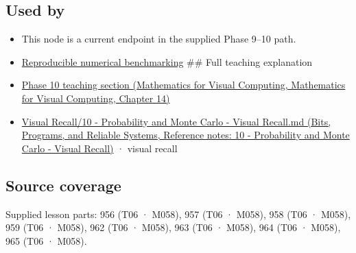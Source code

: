 \subsection{Used by}\label{appendix-bcc44e9d3d02-used-by}

\begin{itemize}
\item
  This node is a current endpoint in the supplied Phase 9--10 path.
\item
  \hyperref[appendix-b9db93e28371]{Reproducible numerical benchmarking} \#\# Full teaching explanation
\item
  \href{../02-Mathematics-for-Visual-Computing/main.pdf\#nameddest=02-foundations-ii-ch030-inference-and-error-metrics-need-explicit-assumptions}{Phase 10 teaching section (Mathematics for Visual Computing, Mathematics for Visual Computing, Chapter 14)}
\item
  \href{../01-Bits-Programs-and-Reliable-Systems/main.pdf\#nameddest=appendix-cb5af353ef77}{Visual Recall/10 - Probability and Monte Carlo - Visual Recall.md (Bits, Programs, and Reliable Systems, Reference notes: 10 - Probability and Monte Carlo - Visual Recall)} · visual recall
\end{itemize}

\subsection{Source coverage}\label{appendix-bcc44e9d3d02-source-coverage}

Supplied lesson parts: 956 (T06 · M058), 957 (T06 · M058), 958 (T06 · M058), 959 (T06 · M058), 962 (T06 · M058), 963 (T06 · M058), 964 (T06 · M058), 965 (T06 · M058).
